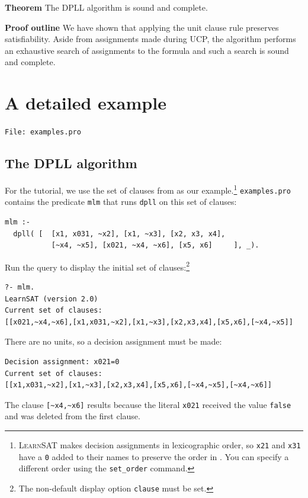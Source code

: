 \documentclass[11pt]{report}
\newcommand*{\p}[1]{\textup{\texttt{#1}}}
\newcommand*{\ls}{\textsc{LearnSAT}}
\newcommand*{\fl}[1]{\parbox{\textwidth}{\raggedleft \p{File: #1}}}
\begin{document}
\bigskip

\textbf{Theorem} The DPLL algorithm is sound and complete.

\textbf{Proof outline} We have shown that applying the unit clause rule preserves satisfiability. Aside from assignments made during UCP, the algorithm performs an exhaustive search of assignments to the formula and such a search is sound and complete.


\newpage

\chapter{A detailed example}\label{ch.mlm}

\fl{examples.pro}

\section{The DPLL algorithm}\label{s.mlm}

For the tutorial, we use the set of clauses from \cite{mlm} as our
example.\footnote{\ls{} makes decision assignments in lexicographic
order, so \p{x21} and \p{x31} have a \p{0} added to their names to
preserve the order in \cite{mlm}. You can specify a different order using the \p{set\_order} command.} \p{examples.pro} contains the predicate \p{mlm} that runs \p{dpll} on this set of clauses:

\begin{verbatim}
mlm :-
  dpll( [  [x1, x031, ~x2], [x1, ~x3], [x2, x3, x4],
           [~x4, ~x5], [x021, ~x4, ~x6], [x5, x6]     ], _).
\end{verbatim}
Run the query to display the initial set of clauses:\footnote{The non-default display option \p{clause} must be set.}
\begin{verbatim}
?- mlm.
LearnSAT (version 2.0)
Current set of clauses:
[[x021,~x4,~x6],[x1,x031,~x2],[x1,~x3],[x2,x3,x4],[x5,x6],[~x4,~x5]]
\end{verbatim}
There are no units, so a decision assignment must be made:
\begin{verbatim}
Decision assignment: x021=0
Current set of clauses:
[[x1,x031,~x2],[x1,~x3],[x2,x3,x4],[x5,x6],[~x4,~x5],[~x4,~x6]]
\end{verbatim}
The clause \verb+[~x4,~x6]+ results because the literal \p{x021} received the value \p{false} and was deleted from the first clause.
\end{document}
